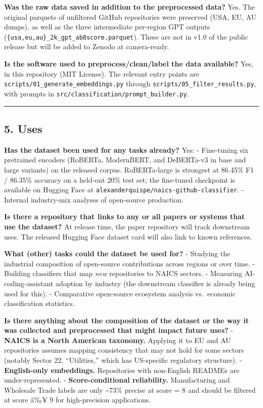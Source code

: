 \textbf{Was the raw data saved in addition to the preprocessed data?}
Yes. The original parquets of unfiltered GitHub repositories were
preserved (USA, EU, AU dumps), as well as the three intermediate
per-region GPT outputs (\texttt{\{usa,eu,au\}\_2k\_gpt\_ab8score.parquet}). These
are not in v1.0 of the public release but will be added to Zenodo at
camera-ready.

\textbf{Is the software used to preprocess/clean/label the data available?}
Yes, in this repository (MIT License). The relevant entry points are
\texttt{scripts/01\_generate\_embeddings.py} through \texttt{scripts/05\_filter\_results.py},
with prompts in \texttt{src/classification/prompt\_builder.py}.

\begin{center}\rule{0.5\linewidth}{0.5pt}\end{center}

\hypertarget{uses}{%
\subsection{5. Uses}\label{uses}}

\textbf{Has the dataset been used for any tasks already?}
Yes:
- Fine-tuning six pretrained encoders (RoBERTa, ModernBERT, and
DeBERTa-v3 in base and large variants) on the released corpus.
RoBERTa-large is strongest at 86.45\% F1 / 86.35\% accuracy on a
held-out 20\% test set; the fine-tuned checkpoint is available on
Hugging Face at \texttt{alexanderquispe/naics-github-classifier}.
- Internal industry-mix analyses of open-source production.

\textbf{Is there a repository that links to any or all papers or systems that
use the dataset?}
At release time, the paper repository will track downstream uses. The
released Hugging Face dataset card will also link to known references.

\textbf{What (other) tasks could the dataset be used for?}
- Studying the industrial composition of open-source contributions
across regions or over time.
- Building classifiers that map \emph{new} repositories to NAICS sectors.
- Measuring AI-coding-assistant adoption by industry (the downstream
classifier is already being used for this).
- Comparative open-source ecosystem analysis vs.~economic
classification statistics.

\textbf{Is there anything about the composition of the dataset or the way it
was collected and preprocessed that might impact future uses?}
- \textbf{NAICS is a North American taxonomy.} Applying it to EU and AU
repositories assumes mapping consistency that may not hold for some
sectors (notably Sector 22, ``Utilities,'' which has US-specific
regulatory structure).
- \textbf{English-only embeddings.} Repositories with non-English READMEs
are under-represented.
- \textbf{Score-conditional reliability.} Manufacturing and Wholesale Trade
labels are only \textasciitilde73\% precise at score = 8 and should be filtered at
score â‰¥ 9 for high-precision applications.


